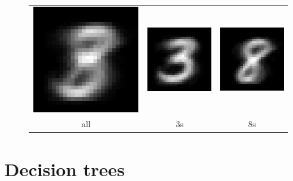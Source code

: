 \documentclass[10pt,letterpaper]{article}
\begin{document}
\begin{figure}[h]
\centering
\begin{tabular}{ccc}
\includegraphics[width=0.2\linewidth]{avgall.png} &
\includegraphics[width=0.2\linewidth]{avg3.png} &
\includegraphics[width=0.2\linewidth]{avg8.png} \\
all & 3s & 8s
\end{tabular}
\end{figure}

\newpage
\section{Decision trees}
\end{document}
